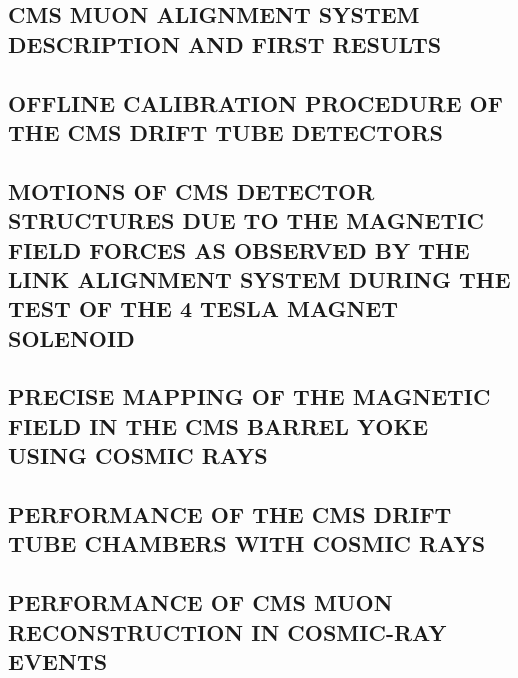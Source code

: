 \documentclass[a4paper, 11pt, twoside, openright]{report}
\begin{document}
\subsection{CMS MUON ALIGNMENT SYSTEM DESCRIPTION AND FIRST RESULTS}


\subsection{OFFLINE CALIBRATION PROCEDURE OF THE CMS DRIFT TUBE DETECTORS}


\subsection{MOTIONS OF CMS DETECTOR STRUCTURES DUE TO THE MAGNETIC FIELD FORCES AS OBSERVED BY THE LINK ALIGNMENT SYSTEM DURING THE TEST OF THE 4 TESLA MAGNET SOLENOID}


\subsection{PRECISE MAPPING OF THE MAGNETIC FIELD IN THE CMS BARREL YOKE USING COSMIC RAYS}


\subsection{PERFORMANCE OF THE CMS DRIFT TUBE CHAMBERS WITH COSMIC RAYS}


\subsection{PERFORMANCE OF CMS MUON RECONSTRUCTION IN COSMIC-RAY EVENTS}

\end{document}
